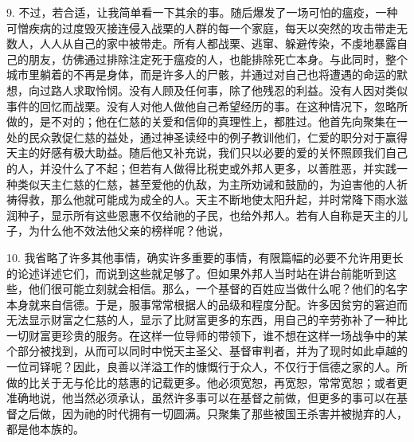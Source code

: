 9. 不过，若合适，让我简单看一下其余的事。随后爆发了一场可怕的瘟疫，一种可憎疾病的过度毁灭接连侵入战栗的人群的每一个家庭，每天以突然的攻击带走无数人，人人从自己的家中被带走。所有人都战栗、逃窜、躲避传染，不虔地暴露自己的朋友，仿佛通过排除注定死于瘟疫的人，也能排除死亡本身。与此同时，整个城市里躺着的不再是身体，而是许多人的尸骸，并通过对自己也将遭遇的命运的默想，向过路人求取怜悯。没有人顾及任何事，除了他残忍的利益。没有人因对类似事件的回忆而战栗。没有人对他人做他自己希望经历的事。在这种情况下，忽略所做的，是不对的；他在仁慈的关爱和信仰的真理性上，都胜过。他首先向聚集在一处的民众敦促仁慈的益处，通过神圣读经中的例子教训他们，仁爱的职分对于赢得天主的好感有极大助益。随后他又补充说，我们只以必要的爱的关怀照顾我们自己的人，并没什么了不起；但若有人做得比税吏或外邦人更多，以善胜恶，并实践一种类似天主仁慈的仁慈，甚至爱他的仇敌，为主所劝诫和鼓励的，为迫害他的人祈祷得救，那么他就可能成为成全的人。天主不断地使太阳升起，并时常降下雨水滋润种子，显示所有这些恩惠不仅给祂的子民，也给外邦人。若有人自称是天主的儿子，为什么他不效法他父亲的榜样呢？他说，\par

10. 我省略了许多其他事情，确实许多重要的事情，有限篇幅的必要不允许用更长的论述详述它们，而说到这些就足够了。但如果外邦人当时站在讲台前能听到这些，他们很可能立刻就会相信。那么，一个基督的百姓应当做什么呢？他们的名字本身就来自信德。于是，服事常常根据人的品级和程度分配。许多因贫穷的窘迫而无法显示财富之仁慈的人，显示了比财富更多的东西，用自己的辛劳弥补了一种比一切财富更珍贵的服务。在这样一位导师的带领下，谁不想在这样一场战争中的某个部分被找到，从而可以同时中悦天主圣父、基督审判者，并为了现时如此卓越的一位司铎呢？因此，良善以洋溢工作的慷慨行于众人，不仅行于信德之家的人。所做的比关于无与伦比的慈惠的记载更多。他必须宽恕，再宽恕，常常宽恕；或者更准确地说，他当然必须承认，虽然许多事可以在基督之前做，但更多的事可以在基督之后做，因为祂的时代拥有一切圆满。只聚集了那些被国王杀害并被抛弃的人，都是他本族的。\par

